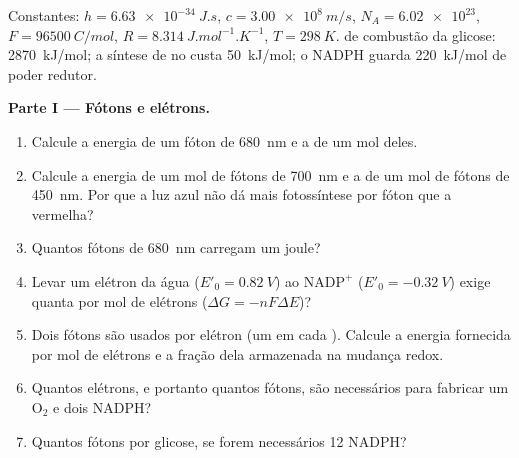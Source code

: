 \begin{problem}
\label{pb:b1:photosynthesis:1}
Constantes: $h = \qty{6.63e-34}{J.s}$, $c = \qty{3.00e8}{m/s}$,
$N_A = \num{6.02e23}$, $F = \qty{96500}{C/mol}$, $R = \qty{8.314}{J.mol^{-1}.K^{-1}}$,
$T = \qty{298}{K}$.  de combustão da glicose:
\qty{2870}{kJ/mol}; a síntese de  no  custa
\qty{50}{kJ/mol}; o NADPH guarda \qty{220}{kJ/mol} de poder redutor.

\medskip
\noindent\textbf{Parte I --- Fótons e elétrons.}
\begin{enumerate}
  \item Calcule a energia de um fóton de \qty{680}{nm} e a de um mol
        deles.
  \item Calcule a energia de um mol de fótons de \qty{700}{nm} e a de
        um mol de fótons de \qty{450}{nm}. Por que a luz azul não dá
        mais fotossíntese por fóton que a vermelha?
  \item Quantos fótons de \qty{680}{nm} carregam um joule?
  \item Levar um elétron da água ($E'_0 = \qty{+0.82}{V}$) ao
        $\mathrm{NADP^+}$ ($E'_0 = \qty{-0.32}{V}$) exige quanta  por mol de elétrons ($\Delta G = -nF\Delta E$)?
  \item Dois fótons são usados por elétron (um em cada ).
        Calcule a energia fornecida por mol de elétrons e a fração dela
        armazenada na mudança redox.
  \item Quantos elétrons, e portanto quantos fótons, são necessários
        para fabricar um $\mathrm{O_2}$ e dois NADPH?
  \item Quantos fótons por glicose, se forem necessários 12 NADPH?
\end{enumerate}


\end{problem}
